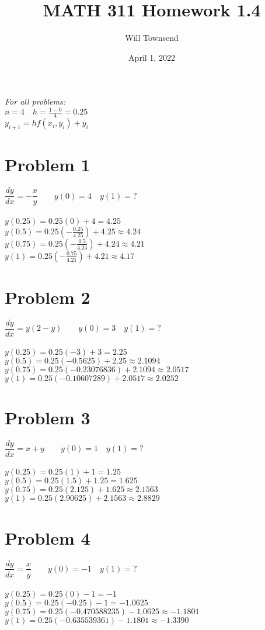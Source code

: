 \documentclass[12pt]{exam}
\title{\textbf{MATH 311 Homework 1.4}}
\author{Will Townsend}
\date{April 1, 2022}
\begin{document}
\maketitle
\begin{center}\emph{For all problems:}\\$n=4\quad h=\frac{1-0}{4}=0.25$\\
$y_{i+1}=hf(x_i,y_i)+y_i$\end{center}
\section*{Problem 1}
$\dfrac{dy}{dx}=-\dfrac{x}{y}\qquad y(0)=4\quad y(1)=?$\\\\
$y(0.25)=0.25(0)+4=4.25$\\
$y(0.5)=0.25(-\frac{0.25}{4.25})+4.25\approx4.24$\\
$y(0.75)=0.25(-\frac{0.5}{4.24})+4.24\approx4.21$\\
$y(1)=0.25(-\frac{0.75}{4.21})+4.21\approx4.17$
\section*{Problem 2}
$\dfrac{dy}{dx}=y(2-y)\qquad y(0)=3\quad y(1)=?$\\\\
$y(0.25)=0.25(-3)+3=2.25$\\
$y(0.5)=0.25(-0.5625)+2.25\approx2.1094$\\
$y(0.75)=0.25(-0.23076836)+2.1094\approx2.0517$\\
$y(1)=0.25(-0.10607289)+2.0517\approx2.0252$\\
\section*{Problem 3}
$\dfrac{dy}{dx}=x+y\qquad y(0)=1\quad y(1)=?$\\\\
$y(0.25)=0.25(1)+1=1.25$\\
$y(0.5)=0.25(1.5)+1.25=1.625$\\
$y(0.75)=0.25(2.125)+1.625\approx2.1563$\\
$y(1)=0.25(2.90625)+2.1563\approx2.8829$\\
\section*{Problem 4}
$\dfrac{dy}{dx}=\dfrac{x}{y}\qquad y(0)=-1\quad y(1)=?$\\\\
$y(0.25)=0.25(0)-1=-1$\\
$y(0.5)=0.25(-0.25)-1=-1.0625$\\
$y(0.75)=0.25(-0.470588235)-1.0625\approx-1.1801$\\
$y(1)=0.25(-0.635539361)-1.1801\approx-1.3390$\\
\end{document}
